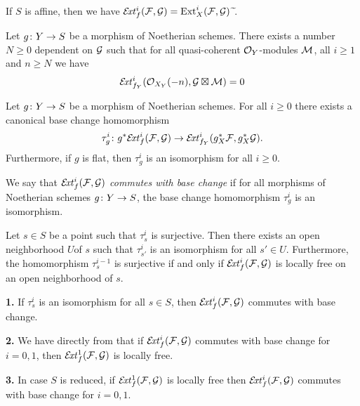 \begin{remark}
	If $S$ is affine, then we have $\EXT^i_f(\mc{F},\mc{G})=\Ext^i_X(\mc{F},\mc{G}){\ \widetilde{}}$.
\end{remark}

\begin{proposition}
	Let $g \colon Y \to S$ be a morphism of Noetherian schemes.
	There exists a number $N\geq 0$ dependent on $\mathcal{G}$ such that for all quasi-coherent $\mathcal{O}_Y$-modules $\mathcal{M}$, all $i\geq 1$ and $n\geq N$ we have
	\[
		\mathcal{E}\!\mathit{xt}^i_{f_Y}(\mathcal{O}_{X_Y}(-n),\mathcal{G} \boxtimes \mathcal{M}) = 0
	\]
\end{proposition}

\begin{proposition}
	Let $g \colon Y \to S$ be a morphism of Noetherian schemes.
	For all $i\geq 0$ there exists a canonical base change homomorphism
	\[
		\tau^i_{g} \colon g^{*}\mathcal{E}\!\mathit{xt}^i_{f}
		(\mathcal{F},\mathcal{G})
		\to
		\mathcal{E}\!\mathit{xt}^i_{f_Y}
		(g_X^{*}\mathcal{F}, g_X^{*}\mathcal{G}).
	\]
	Furthermore, if $g$ is flat, then $\tau^i_g$ is an isomorphism for all $i\geq 0$.
\end{proposition}

\begin{definition}
	We say that $\mathcal{E}\!\mathit{xt}^i_{f}(\mathcal{F},\mathcal{G})$ \emph{commutes with base change} if for all morphisms of Noetherian schemes $g \colon Y \to S$, the base change homomorphism $\tau^i_g$ is an isomorphism.
\end{definition}

\begin{proposition}
\label{prop:ext-base-change}
	Let $s \in S$ be a point such that $\tau^i_s$ is surjective. Then there exists an open neighborhood $U$of $s$ such that $\tau^i_{s'}$ is an isomorphism for all $s'\in U$.
	Furthermore, the homomorphism $\tau^{i-1}_{s}$ is surjective if and only if $\mathcal{E}\!\mathit{xt}^i_{f}(\mathcal{F},\mathcal{G})$ is locally free on an open neighborhood of $s$.
\end{proposition}

\begin{remark}

	\textbf{1.} If $\tau^i_{s}$ is an isomorphism for all $s\in S$, then $\mathcal{E}\!\mathit{xt}_{f}^i(\mathcal{F},\mathcal{G})$ commutes with base change.

	\textbf{2.} We have directly from  that if $\mathcal{E}\!\mathit{xt}^i_f(\mathcal{F},\mathcal{G})$ commutes with base change for $i=0,1$, then $\mathcal{E}\!\mathit{xt}^1_f(\mathcal{F},\mathcal{G})$ is locally free.

	\textbf{3.} In case $S$ is reduced, if $\mathcal{E}\!\mathit{xt}^1_f(\mathcal{F},\mathcal{G})$ is locally free then $\mathcal{E}\!\mathit{xt}^i_f(\mathcal{F},\mathcal{G})$ commutes with base change for $i=0,1$.
\end{remark}


